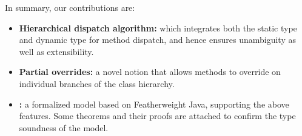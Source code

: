 In summary, our contributions are: 
\begin{itemize}
	\item \textbf{Hierarchical dispatch algorithm:} which integrates both the static type and dynamic type for method dispatch, and hence
	ensures unambiguity as well as extensibility.
	\item \textbf{Partial overrides:} a novel notion that allows
          methods to override on individual branches of the class hierarchy.
	\item \textbf{\name:} a formalized model based on Featherweight Java, supporting the above features. Some theorems and their proofs
	are attached to confirm the type soundness of the model.
\end{itemize}

 